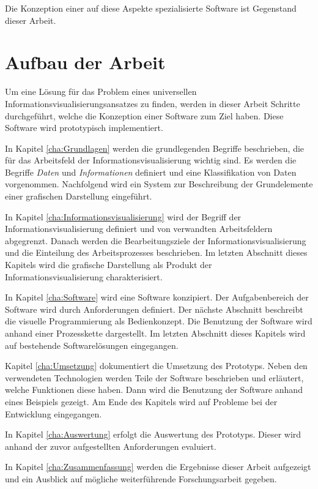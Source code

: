 \documentclass[a4paper, 
               12pt,
               DIV=calc,
               version=first,
               pdftex,
               headsepline,
               footsepline,
               bibliography=totocnumbered,
               listof=numbered]{scrreprt}
\begin{document}
Die Konzeption einer auf diese Aspekte spezialisierte Software ist Gegenstand dieser Arbeit.

\section{Aufbau der Arbeit}
Um eine Lösung für das Problem eines universellen Informationsvisualisierungsansatzes
zu finden, werden in dieser Arbeit Schritte durchgeführt, welche die Konzeption einer Software zum Ziel haben.
Diese Software wird prototypisch implementiert.

In Kapitel \ref{cha:Grundlagen} werden die grundlegenden Begriffe beschrieben, die für
das Arbeitsfeld der Informationsvisualisierung wichtig sind. Es werden die Begriffe
\textit{Daten} und \textit{Informationen} definiert und eine Klassifikation von Daten vorgenommen.
Nachfolgend wird ein System zur Beschreibung der Grundelemente einer grafischen Darstellung
eingeführt. 

In Kapitel \ref{cha:Informationsvisualisierung} wird der Begriff der Informationsvisualisierung
definiert und von verwandten Arbeitsfeldern abgegrenzt. Danach werden die Bearbeitungsziele
der Informationsvisualisierung und die Einteilung des Arbeitsprozesses
beschrieben. Im letzten Abschnitt dieses Kapitels wird die grafische Darstellung als Produkt
der Informationsvisualisierung charakterisiert.

In Kapitel \ref{cha:Software} wird eine Software konzipiert.
Der Aufgabenbereich der Software wird durch Anforderungen definiert. Der nächste Abschnitt beschreibt
die visuelle Programmierung als Bedienkonzept. Die Benutzung der Software wird anhand einer
Prozesskette dargestellt. Im letzten Abschnitt dieses Kapitels wird auf bestehende Softwarelösungen
eingegangen.

Kapitel \ref{cha:Umsetzung} dokumentiert die Umsetzung des Prototyps. Neben den verwendeten
Technologien werden Teile der Software beschrieben und erläutert, welche Funktionen diese haben.
Dann wird die Benutzung der Software anhand eines Beispiels gezeigt.
Am Ende des Kapitels wird auf Probleme bei der Entwicklung eingegangen.

In Kapitel \ref{cha:Auswertung} erfolgt die Auswertung des Prototyps. Dieser wird anhand der zuvor
aufgestellten Anforderungen evaluiert.

In Kapitel \ref{cha:Zusammenfassung} werden die Ergebnisse dieser Arbeit aufgezeigt und ein
Ausblick auf mögliche weiterführende Forschungsarbeit gegeben.
\end{document}
